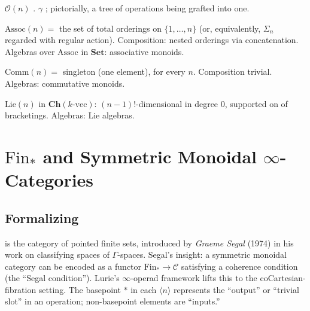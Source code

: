 \begin{howtosay}
$\mathcal{O}(n)$ .
$\gamma$ ; pictorially,
a tree of operations being grafted into one.
\end{howtosay}

\begin{example_thm}
\label{ex:assoc-operad}
$\mathrm{Assoc}(n) = $ the set of total orderings on $\{1, \ldots, n\}$
(or, equivalently, $\Sigma_n$ regarded with regular action).
Composition: nested orderings via concatenation. Algebras over
$\mathrm{Assoc}$ in $\mathbf{Set}$: associative monoids.
\end{example_thm}

\begin{example_thm}
\label{ex:comm-operad}
$\mathrm{Comm}(n) = $ singleton (one element), for every $n$. Composition
trivial. Algebras: commutative monoids.
\end{example_thm}

\begin{example_thm}
\label{ex:lie-operad}
$\mathrm{Lie}(n)$ in $\mathbf{Ch}(k\text{-vec})$: $(n-1)!$-dimensional in
degree $0$, supported on  of bracketings. Algebras:
Lie algebras.
\end{example_thm}


\section{$\mathrm{Fin}_*$ and Symmetric Monoidal $\infty$-Categories}
\label{sec:fin-star}

\subsection{Formalizing}

\begin{nameorigin}
 is the category of pointed finite sets,
introduced by \emph{Graeme Segal} (1974) in his work on classifying
spaces of $\Gamma$-spaces. Segal's insight: a symmetric monoidal
category can be encoded as a functor $\mathrm{Fin}_* \to \mathcal{C}$
satisfying a coherence condition (the ``Segal condition''). Lurie's
$\infty$-operad framework lifts this to the coCartesian-fibration
setting. The basepoint $*$ in each $\langle n \rangle$ represents the
``output'' or ``trivial slot'' in an operation; non-basepoint elements
are ``inputs.''
\end{nameorigin}

